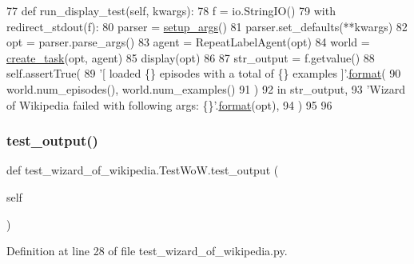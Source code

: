 \begin{DoxyCode}
77     \textcolor{keyword}{def }run\_display\_test(self, kwargs):
78         f = io.StringIO()
79         with redirect\_stdout(f):
80             parser = \hyperlink{namespaceparlai_1_1chat__service_1_1services_1_1browser__chat_1_1client_a20c9862417d1f1a61b06551de0820ee4}{setup\_args}()
81             parser.set\_defaults(**kwargs)
82             opt = parser.parse\_args()
83             agent = RepeatLabelAgent(opt)
84             world = \hyperlink{namespaceparlai_1_1core_1_1worlds_a79969c7ba76d4b3c500f5bb776444dc6}{create\_task}(opt, agent)
85             display(opt)
86 
87         str\_output = f.getvalue()
88         self.assertTrue(
89             \textcolor{stringliteral}{'[ loaded \{\} episodes with a total of \{\} examples ]'}.\hyperlink{namespaceparlai_1_1chat__service_1_1services_1_1messenger_1_1shared__utils_a32e2e2022b824fbaf80c747160b52a76}{format}(
90                 world.num\_episodes(), world.num\_examples()
91             )
92             \textcolor{keywordflow}{in} str\_output,
93             \textcolor{stringliteral}{'Wizard of Wikipedia failed with following args: \{\}'}.\hyperlink{namespaceparlai_1_1chat__service_1_1services_1_1messenger_1_1shared__utils_a32e2e2022b824fbaf80c747160b52a76}{format}(opt),
94         )
95 
96 
\end{DoxyCode}
\mbox{\label{classtest__wizard__of__wikipedia_1_1TestWoW_a5a2ccfeb297d1fa8b356bcb9c4ce2225}} 
\subsubsection{\texorpdfstring{test\+\_\+output()}{test\_output()}}
{\footnotesize\ttfamily def test\+\_\+wizard\+\_\+of\+\_\+wikipedia.\+Test\+Wo\+W.\+test\+\_\+output (\begin{DoxyParamCaption}\item[{}]{self }\end{DoxyParamCaption})}



Definition at line 28 of file test\+\_\+wizard\+\_\+of\+\_\+wikipedia.\+py.


